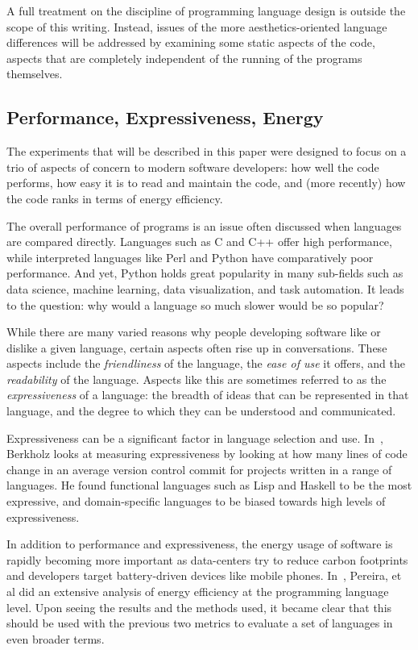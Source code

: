 A full treatment on the discipline of programming language design is outside the scope of this writing. Instead, issues of the more aesthetics-oriented language differences will be addressed by examining some static aspects of the code, aspects that are completely independent of the running of the programs themselves.

\subsection{Performance, Expressiveness, Energy}

The experiments that will be described in this paper were designed to focus on a trio of aspects of concern to modern software developers: how well the code performs, how easy it is to read and maintain the code, and (more recently) how the code ranks in terms of energy efficiency.

The overall performance of programs is an issue often discussed when languages are compared directly. Languages such as C and C++ offer high performance, while interpreted languages like Perl and Python have comparatively poor performance. And yet, Python holds great popularity in many sub-fields such as data science, machine learning, data visualization, and task automation. It leads to the question: why would a language so much slower would be so popular?

While there are many varied reasons why people developing software like or dislike a given language, certain aspects often rise up in conversations. These aspects include the \textit{friendliness} of the language, the \textit{ease of use} it offers, and the \textit{readability} of the language. Aspects like this are sometimes referred to as the \textit{expressiveness} of a language: the breadth of ideas that can be represented in that language, and the degree to which they can be understood and communicated.

Expressiveness can be a significant factor in language selection and use. In~\cite{berkholz}, Berkholz looks at measuring expressiveness by looking at how many lines of code change in an average version control commit for projects written in a range of languages. He found functional languages such as Lisp and Haskell to be the most expressive, and domain-specific languages to be biased towards high levels of expressiveness.

In addition to performance and expressiveness, the energy usage of software is rapidly becoming more important as data-centers try to reduce carbon footprints and developers target battery-driven devices like mobile phones. In~\cite{pereira}, Pereira, et al did an extensive analysis of energy efficiency at the programming language level. Upon seeing the results and the methods used, it became clear that this should be used with the previous two metrics to evaluate a set of languages in even broader terms.

